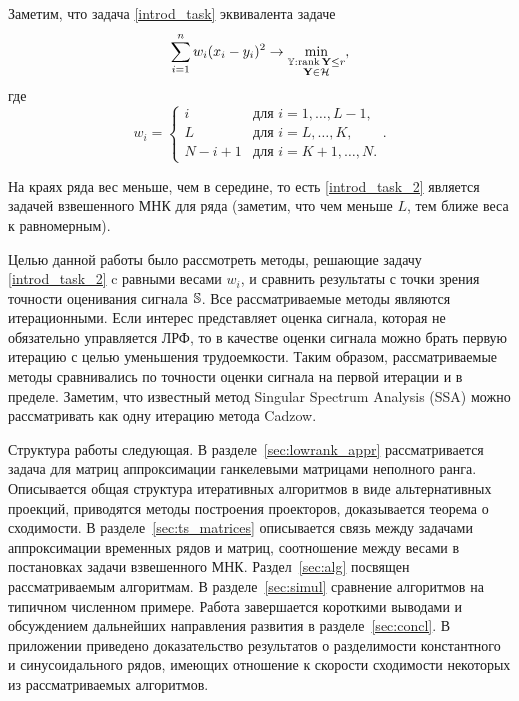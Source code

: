 \documentclass[12pt,a4paper,fleqn,leqno]{article}
\def\rank{\mathop{\mathrm{rank}}}
\begin{document}
Заметим, что задача \eqref{introd_task} эквивалента задаче
\begin{equation}\label{introd_task_2}
\sum_{i = 1}^n w_i(x_i - y_i)^2 \to \min_{\substack{\tsY: \rank \bfY \le r \\ \bfY \in \calH}},
\end{equation}
где
\begin{equation}
\label{eq:w}
w_i = \begin{cases}
i & \text{для $i = 1, \ldots, L-1,$}\\
L & \text{для $i = L, \ldots, K,$}\\
N - i + 1 & \text{для $i = K + 1, \ldots, N.$}
\end{cases}.
\end{equation}

На краях ряда вес меньше, чем в середине, то есть \eqref{introd_task_2} является задачей взвешенного МНК для ряда (заметим, что чем меньше $L$, тем ближе веса к равномерным).

Целью данной работы было рассмотреть методы, решающие задачу \eqref{introd_task_2} c равными весами $w_i$, и сравнить результаты с точки зрения точности оценивания сигнала $\mathbb{S}$. Все рассматриваемые методы являются итерационными. Если интерес представляет оценка сигнала, которая не обязательно управляется ЛРФ, то в качестве оценки сигнала можно брать первую итерацию с целью уменьшения трудоемкости. Таким образом, рассматриваемые методы сравнивались по точности оценки сигнала на первой итерации и в пределе. Заметим, что известный метод Singular Spectrum Analysis (SSA) \cite{Broomhead.King1986, Vautard.etal1992, Elsner.Tsonis1996, Golyandina.etal2001, Ghil.etal2002, Golyandina.Zhigljavsky2012} можно
рассматривать как одну итерацию метода Cadzow.

Структура работы следующая.  В разделе~\ref{sec:lowrank_appr} рассматривается задача для матриц аппроксимации ганкелевыми матрицами неполного ранга. 
Описывается общая структура итеративных алгоритмов в виде альтернативных проекций, приводятся методы построения проекторов, доказывается теорема о сходимости.
В разделе~\ref{sec:ts_matrices} описывается связь между задачами аппроксимации временных рядов и матриц, соотношение между весами в постановках задачи 
взвешенного МНК. Раздел~\ref{sec:alg} посвящен рассматриваемым алгоритмам. В разделе~\ref{sec:simul} сравнение алгоритмов на типичном численном примере.
Работа завершается короткими выводами и обсуждением дальнейших направления развития в разделе~\ref{sec:concl}. В приложении приведено доказательство результатов
о разделимости константного и синусоидального рядов, имеющих отношение к скорости сходимости некоторых из рассматриваемых алгоритмов.
\end{document}
